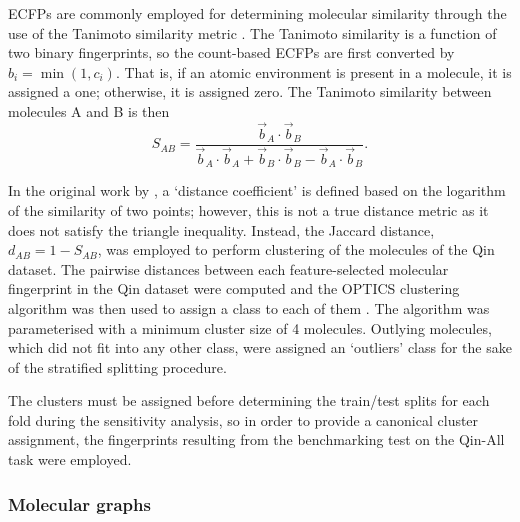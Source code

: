 ECFPs are commonly employed for determining molecular similarity through the use
of the Tanimoto similarity metric
\cite{tanimotoElementaryMathematicalTheory1958,bajuszWhyTanimotoIndex2015,butinaUnsupervisedDataBase1999}.
The Tanimoto similarity is a function of two binary fingerprints, so the
count-based ECFPs are first converted by $b_i = \min (1, c_i)$. That is, if an
atomic environment is present in a molecule, it is assigned a one; otherwise, it
is assigned zero. The Tanimoto similarity between molecules A and B is then
\begin{equation}
    S_{AB} = \frac{\vec{b}_A \cdot \vec{b}_B}{\vec{b}_A \cdot \vec{b}_A + \vec{b}_B \cdot \vec{b}_B - \vec{b}_A \cdot \vec{b}_B}.
\end{equation}

In the original work by \citeauthor{tanimotoElementaryMathematicalTheory1958}, a
`distance coefficient' is defined based on the logarithm of the similarity of
two points; however, this is not a true distance metric as it does not satisfy
the triangle inequality. Instead, the Jaccard distance, $d_{AB} = 1 - S_{AB}$,
was employed to perform clustering of the molecules of the Qin dataset. The
pairwise distances between each feature-selected molecular fingerprint in the
Qin dataset were computed and the OPTICS clustering algorithm was then used to
assign a class to each of them \cite{ankerstOPTICSOrderingPoints1999}. The
algorithm was parameterised with a minimum cluster size of 4 molecules. Outlying
molecules, which did not fit into any other class, were assigned an `outliers'
class for the sake of the stratified splitting procedure.

The clusters must be assigned before determining the train/test splits for each
fold during the sensitivity analysis, so in order to provide a canonical cluster
assignment, the fingerprints resulting from the benchmarking test on the Qin-All
task were employed.

\subsubsection{Molecular graphs}


